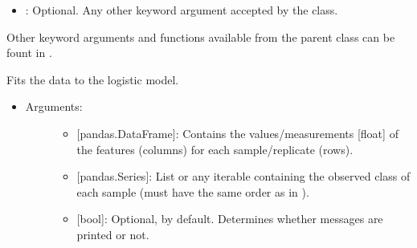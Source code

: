 \documentclass[letterpaper,10pt,english]{sphinxmanual}
\begin{document}
\begin{fulllineitems}
\begin{itemize}
\begin{description}
\begin{itemize}
\item {} 
: Optional. Any other keyword argument accepted by
the  class.

\end{itemize}

Other keyword arguments and functions available from the parent
class  can be fount in .

\end{description}

\end{itemize}

\begin{fulllineitems}
\label{\detokenize{models:data_tools.models.Lasso.fit_data}}
Fits the data to the logistic model.
\begin{itemize}
\item {} \begin{description}
\item[{Arguments:}] \leavevmode\begin{itemize}
\item {} 
 {[}pandas.DataFrame{]}: Contains the values/measurements
{[}float{]} of the features (columns) for each
sample/replicate (rows).

\item {} 
 {[}pandas.Series{]}: List or any iterable containing the
observed class of each sample (must have the same order as
in ).

\item {} 
 {[}bool{]}: Optional,  by default.
Determines whether messages are printed or not.

\end{itemize}

\end{description}

\end{itemize}

\end{fulllineitems}


\end{fulllineitems}
\end{document}
